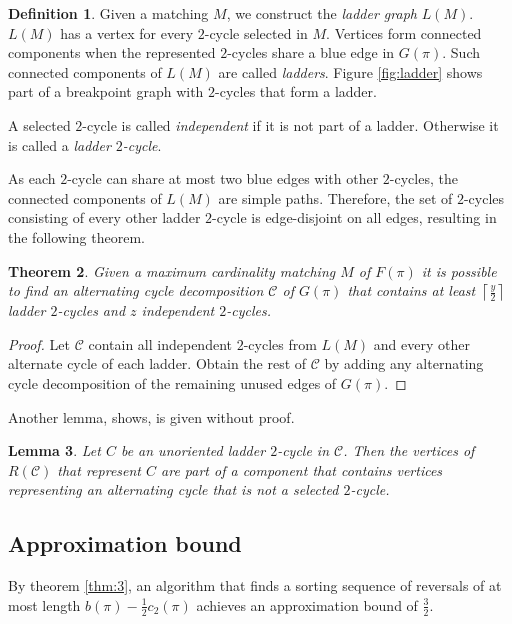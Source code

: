 \documentclass[11pt,DIV=11]{scrartcl}
\newtheorem{theorem}{Theorem}[section]
\newtheorem{lemma}[theorem]{Lemma}
\theoremstyle{definition}
\newtheorem{definition}[theorem]{Definition}
\theoremstyle{remark}
\begin{document}
\begin{definition}
Given a matching $M$, we construct the \textit{ladder graph} $L(M)$. $L(M)$ has a vertex for every $2$-cycle selected in $M$. Vertices form connected components when the represented $2$-cycles share a blue edge in $G(\pi)$. Such connected components of $L(M)$ are called \textit{ladders}. Figure \ref{fig:ladder} shows part of a breakpoint graph with $2$-cycles that form a ladder.

A selected $2$-cycle is called \textit{independent} if it is not part of a ladder. Otherwise it is called a \textit{ladder $2$-cycle}.
\end{definition}

As each $2$-cycle can share at most two blue edges with other $2$-cycles, the connected components of $L(M)$ are simple paths. Therefore, the set of $2$-cycles consisting of every other ladder $2$-cycle is edge-disjoint on all edges, resulting in the following theorem.

\begin{theorem}
\label{thm:5}
Given a maximum cardinality matching $M$ of $F(\pi)$ it is possible to find an alternating cycle decomposition $\mathcal{C}$ of $G(\pi)$ that contains at least $\left\lceil \frac{y}{2} \right\rceil$ ladder $2$-cycles and $z$ independent $2$-cycles.
\end{theorem}

\begin{proof}
Let $\mathcal{C}$ contain all independent $2$-cycles from $L(M)$ and every other alternate cycle of each ladder. Obtain the rest of $\mathcal{C}$ by adding any alternating cycle decomposition of the remaining unused edges of $G(\pi)$.
\end{proof}

Another lemma, \citeauthor*{Christie1998} shows, is given without proof.

\begin{lemma}
\label{lem:10}
Let $C$ be an unoriented ladder $2$-cycle in $\mathcal{C}$. Then the vertices of $R(\mathcal{C})$ that represent $C$ are part of a component that contains vertices representing an alternating cycle that is not a selected $2$-cycle.
\end{lemma}

\subsection{Approximation bound}
\label{sec:approximation_bound}

By theorem \ref{thm:3}, an algorithm that finds a sorting sequence of reversals of at most length $b(\pi) - \frac{1}{2} c_2(\pi)$ achieves an approximation bound of $\frac{3}{2}$.
\end{document}
